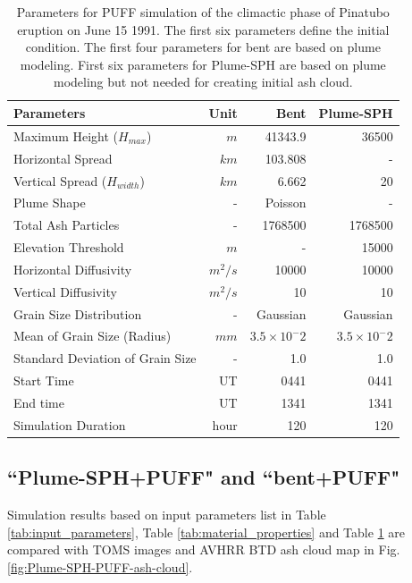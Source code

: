 \begin{table}[htp]
\centering
      \caption{Parameters for PUFF simulation of the climactic phase of Pinatubo eruption on June 15 1991. The first six parameters define the initial condition. The first four parameters for bent are based on plume modeling. First six parameters for Plume-SPH are based on plume modeling but not needed for creating initial ash cloud.}
	  \begin{tabular}{lrrr}
	    \hline
	    Parameters    & Unit & Bent & Plume-SPH \\
	    \hline
	    Maximum Height ($H_{max}$) & $m$ & 41343.9 & 36500 \\
	    Horizontal Spread & $km$ & 103.808 & -\\
	    Vertical Spread ($H_{width}$) & $km$ & 6.662  & 20 \\
	    Plume Shape & - & Poisson & - \\
	    Total Ash Particles  & - & 1768500 & 1768500 \\
	    Elevation Threshold & $m$ & - &  15000 \\
	    Horizontal Diffusivity & $m^2/s$ &10000 & 10000\\
	    Vertical Diffusivity & $m^2/s$ & 10 & 10 \\
	    Grain Size Distribution & - & Gaussian & Gaussian  \\
	    Mean of Grain Size (Radius) & $mm$ & $3.5 \times 10 ^-2$ & $3.5 \times 10 ^-2$ \\
	    Standard Deviation of Grain Size & - &  1.0 & 1.0 \\
	    	Start Time & UT & 0441 & 0441 \\
	    End time & UT & 1341 & 1341 \\
	    Simulation Duration & hour & 120 & 120 \\
	    \hline
	  \end{tabular}
	  \label{tab:input_parameter_PUFF_simulation}
\end{table}

\subsection{``Plume-SPH+PUFF" and ``bent+PUFF"}

Simulation results based on input parameters list in Table \ref{tab:input_parameters}, Table \ref{tab:material_properties} and Table \ref{tab:input_parameter_PUFF_simulation} are compared with TOMS images and AVHRR BTD ash cloud map in Fig. \ref{fig:Plume-SPH-PUFF-ash-cloud}.

